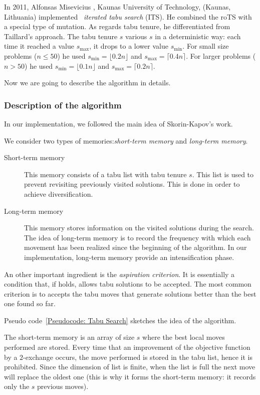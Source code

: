 In 2011, Alfonsas Misevicius  , Kaunas University of Technology, (Kaunas, Lithuania) implemented~\cite{Misevicius2011} \textit{iterated tabu search} (ITS). He combined the roTS with a special type of mutation. As regards tabu tenure, he differentiated from  Taillard's approach. The tabu tenure $s$ various $s$ in a deterministic way: each time it reached a value $s_\mathrm{max}$, it drops to a lower value $s_\mathrm{min}$. For small size problems ($n\le 50$) he used $s_\mathrm{min}=\lfloor 0.2n \rfloor$ and $s_\mathrm{max}=\lceil 0.4n\rceil$. For larger problems ($n>50$) he used $s_\mathrm{min}=\lfloor 0.1n \rfloor$ and $s_\mathrm{max}=\lceil 0.2n\rceil$.

Now we are going to describe the algorithm in details.

\subsubsection{Description of the algorithm} 

In our implementation, we followed the main idea of Skorin-Kapov's work.

We consider two types of memories:\textit{short-term memory}
 and \textit{long-term memory}.
\begin{description}
	\item[Short-term memory ] This memory consists of a tabu list with tabu tenure $s$. This list is used to prevent revisiting previously visited solutions. This is done in order to achieve diversification.
	
	\item[Long-term memory] This memory stores information on the visited solutions during the search. The idea of long-term memory is to record the frequency with which each movement has been realized since the beginning of the algorithm. In our implementation, long-term memory provide an intensification phase.
\end{description}


An other important ingredient is the \textit{aspiration criterion}. It is essentially a condition that, if holds, allows tabu solutions to be accepted. The most common criterion is  to accepts the tabu moves that generate solutions  better than the best one found so far.


Pseudo code~\ref{Pseudocode: Tabu Search} sketches the idea of the algorithm.

The short-term memory is an array of size $s$ where the best local moves performed are stored. Every time that an improvement of the objective function by a $2$-exchange occurs, the move performed is stored in the tabu list, hence it is prohibited. Since the dimension of  list  is finite, when the list is full the next move will replace the oldest one (this is why it forms the short-term memory: it records only the $s$ previous moves). 
 
